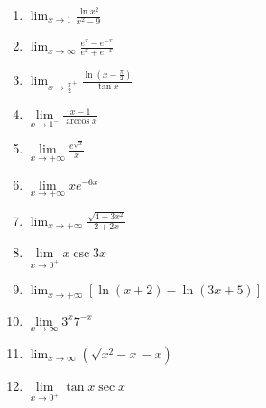\documentclass[12pt]{article}
\newif\ifans
\begin{document}
\begin{enumerate}
\ifans{\fbox{$\frac{2}{3}$}} \fi

\item $\lim_{x \rightarrow 1}{\frac{\ln{x^2}}{x^2-9}}$

\ifans{\fbox{$0$}} \fi

\item $\lim_{x \rightarrow \infty}{\frac{e^x-e^{-x}}{e^x+e^{-x}}}$

\ifans{\fbox{$1$}} \fi

\item $\lim_{x \rightarrow \frac{\pi}{2}^{+}}{\frac{\ln{\left(x-\frac{\pi}{2}\right)}}{\tan{x}}}$

\ifans{\fbox{$0$}} \fi

\item $\lim\limits_{x\rightarrow 1^-} \frac{x-1}{\arccos{x}}$ 

\ifans{\fbox{0}} \fi

\item $\lim\limits_{x\rightarrow +\infty}\frac{e^{\sqrt{x}}}{x}$ 

\ifans{\fbox{$+\infty$}} \fi

\item $\lim\limits_{x\rightarrow +\infty} xe^{-6x}$ 

\ifans{\fbox{0}} \fi

\item $\lim_{x \rightarrow +\infty}{\frac{\sqrt{4+3x^2}}{2+2x}}$

\ifans{\fbox{$\frac{\sqrt{3}}{2}$}} \fi

\item $\lim\limits_{x\rightarrow 0^+} x \csc{3x}$

\ifans{\fbox{$\frac{1}{3}$}} \fi  

\item $\lim_{x \rightarrow+\infty}\left[\ln{(x+2)}-\ln{(3x+5)}\right]$

\ifans{\fbox{$\ln{\left(\frac{1}{3}\right)}$}} \fi

\item $\lim\limits_{x\rightarrow \infty} 3^{x}7^{-x}$ 

\ifans{\fbox{0}} \fi

\item  $\displaystyle \lim_{x\rightarrow \infty}{\left(\sqrt{x^2-x}-x\right)}$

\ifans{\fbox{$\displaystyle -\frac{1}{2}$}} \fi

\item $\lim\limits_{x\rightarrow 0^+} \tan{x}\sec{x}$ 


\end{enumerate}
\end{document}

